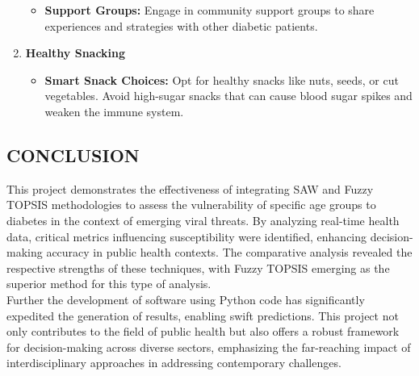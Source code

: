 \documentclass[12pt,a4paper]{article}
\begin{document}
\begin{enumerate}
\begin{itemize}
        \item \textbf{Support Groups: } Engage in community support groups to share experiences and strategies with other diabetic patients.
     
        \end{itemize}

    \item \textbf{Healthy Snacking}

    \begin{itemize}

        \item \textbf{Smart Snack Choices: }Opt for healthy snacks like nuts, seeds, or cut vegetables. Avoid high-sugar snacks that can cause blood sugar spikes and weaken the immune system.
     
        \end{itemize}

\end{enumerate}


\newpage
{}  
\begin{center}
    \section*{CONCLUSION}
\end{center}
\noindent
\hspace{2em}This project demonstrates the effectiveness of integrating SAW and Fuzzy TOPSIS methodologies to assess the vulnerability of specific age groups to diabetes in the context of emerging viral threats. By analyzing real-time health data, critical metrics influencing susceptibility were identified, enhancing decision-making accuracy in public health contexts. The comparative analysis revealed the respective strengths of these techniques, with Fuzzy TOPSIS emerging as the superior method for this type of analysis.\\

\hspace{1em}Further the development of software using Python code has significantly expedited the generation of results, enabling swift predictions. This project not only contributes to the field of public health but also offers a robust framework for decision-making across diverse sectors, emphasizing the far-reaching impact of interdisciplinary approaches in addressing contemporary challenges.
\end{document}
